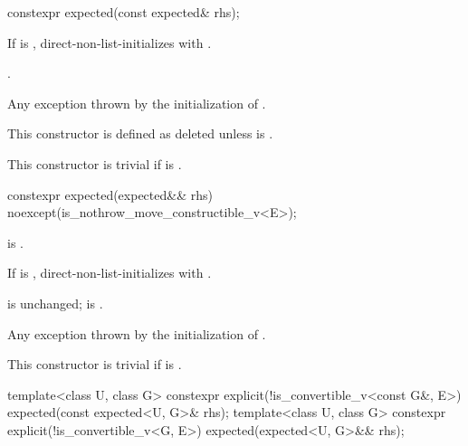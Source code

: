 %
\begin{itemdecl}
constexpr expected(const expected& rhs);
\end{itemdecl}

\begin{itemdescr}
\pnum
\effects
If  is ,
direct-non-list-initializes  with .

\pnum
\ensures
{}.

\pnum
\throws
Any exception thrown by the initialization of .

\pnum
\remarks
This constructor is defined as deleted
unless  is .

\pnum
This constructor is trivial
if  is .
\end{itemdescr}

%
\begin{itemdecl}
constexpr expected(expected&& rhs) noexcept(is_nothrow_move_constructible_v<E>);
\end{itemdecl}

\begin{itemdescr}
\pnum
\constraints
{} is .

\pnum
\effects
If  is ,
direct-non-list-initializes  with .

\pnum
\ensures
{} is unchanged;
 is .

\pnum
\throws
Any exception thrown by the initialization of .

\pnum
\remarks
This constructor is trivial
if  is .
\end{itemdescr}

%
\begin{itemdecl}
template<class U, class G>
  constexpr explicit(!is_convertible_v<const G&, E>) expected(const expected<U, G>& rhs);
template<class U, class G>
  constexpr explicit(!is_convertible_v<G, E>) expected(expected<U, G>&& rhs);
\end{itemdecl}

